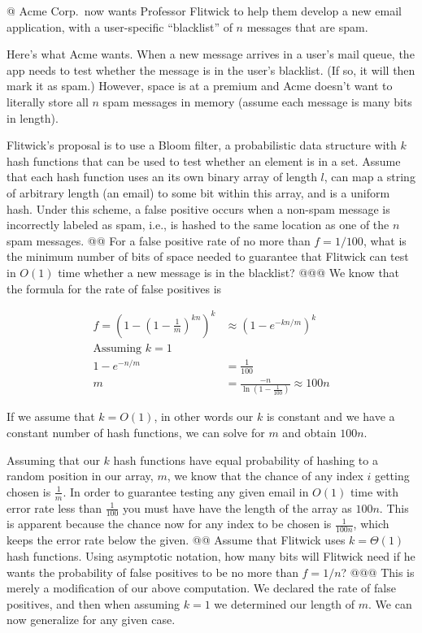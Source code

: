 \documentclass[10pt]{article}
\begin{document}
\begin{easylist}[enumerate]
    @ Acme Corp.\ now wants Professor Flitwick to help them develop a new email application, with a user-specific
    ``blacklist'' of $n$ messages that are spam.\newline

    Here's what Acme wants. When a new message arrives in a user's mail queue, the app needs to test whether the message
    is in the user's blacklist. (If so, it will then mark it as spam.) However, space is at a premium and Acme doesn't
    want to literally store all $n$ spam messages in memory (assume each message is many bits in length).\newline

    Flitwick's proposal is to use a Bloom filter, a probabilistic data structure with $k$ hash functions that can be
    used to test whether an element is in a set. Assume that each hash function uses an its own binary array of length
    $l$, can map a string of arbitrary length (an email) to some bit within this array, and is a uniform hash. Under
    this scheme, a false positive occurs when a non-spam message is incorrectly labeled as spam, i.e., is hashed to the
    same location as one of the $n$ spam messages.
    @@ For a false positive rate of no more than $f = 1/100$, what is the minimum number of bits of space needed to
    guarantee that Flitwick can test in $O(1)$ time whether a new message is in the blacklist?
    @@@ We know that the formula for the rate of false positives is

    \[ \begin{aligned}
        f = {\left(1 - {\left( 1 - \frac{1}{m} \right)}^{kn} \right)}^k &\approx {\left( 1 - e^{-kn/m} \right)}^k\\
        \text{Assuming } k = 1\\
        1 -  e^{-n/m} &= \frac{1}{100}\\
        m &= \frac{-n}{\ln\left( 1 - \frac{1}{100} \right)} \approx \boxed{100n}
    \end{aligned} \]

    If we assume that $k = O(1)$, in other words our $k$ is constant and we have a constant number of hash
    functions, we can solve for $m$ and obtain $100n$.

    Assuming that our $k$ hash functions have equal probability of hashing to a random position in our array, $m$,
    we know that the chance of any index $i$ getting chosen is $\frac{1}{m}$. In order to guarantee testing any given
    email in $O(1)$ time with error rate less than $\frac{1}{100}$ you must have have the length of the array as $100n$.
    This is apparent because the chance now for any index to be chosen is $\frac{1}{100n}$, which keeps the error rate
    below the given.
    @@ Assume that Flitwick uses $k = \Theta(1)$ hash functions. Using asymptotic notation, how many bits will Flitwick
    need if he wants the probability of false positives to be no more than $f = 1/n$?
    @@@ This is merely a modification of our above computation. We declared the rate of false positives, and then when
    assuming $k = 1$ we determined our length of $m$. We can now generalize for any given case.


\end{easylist}
\end{document}
